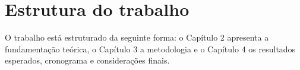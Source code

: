 \section{Estrutura do trabalho}

O trabalho está estruturado da seguinte forma: o Capítulo 2 apresenta a fundamentação teórica, o Capítulo 3 a metodologia e o
Capítulo 4 os resultados esperados, cronograma e considerações finais.

